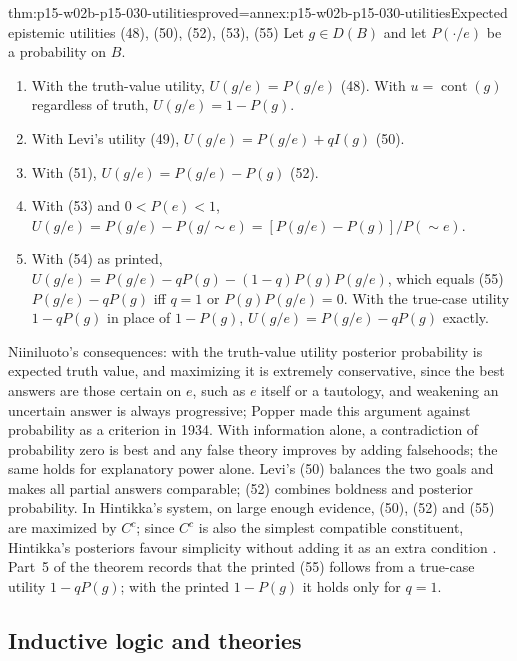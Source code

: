 \begin{hbtheorem}{thm:p15-w02b-p15-030-utilities}{proved=annex:p15-w02b-p15-030-utilities}{Expected epistemic utilities (48), (50), (52), (53), (55)}
Let \(g\in D(B)\) and let \(P(\cdot/e)\) be a probability on \(B\).
\begin{enumerate}
\item With the truth-value utility, \(U(g/e)=P(g/e)\) (48). With
  \(u=\operatorname{cont}(g)\) regardless of truth, \(U(g/e)=1-P(g)\).
\item With Levi's utility (49), \(U(g/e)=P(g/e)+qI(g)\) (50).
\item With (51), \(U(g/e)=P(g/e)-P(g)\) (52).
\item With (53) and \(0<P(e)<1\),
  \(U(g/e)=P(g/e)-P(g/\sim e)=[P(g/e)-P(g)]/P(\sim e)\).
\item With (54) as printed,
  \(U(g/e)=P(g/e)-qP(g)-(1-q)P(g)P(g/e)\), which equals (55)
  \(P(g/e)-qP(g)\) iff \(q=1\) or \(P(g)P(g/e)=0\). With the true-case
  utility \(1-qP(g)\) in place of \(1-P(g)\), \(U(g/e)=P(g/e)-qP(g)\)
  exactly.
\end{enumerate}
\end{hbtheorem}

Niiniluoto's consequences: with the truth-value utility posterior
probability is expected truth value, and maximizing it is extremely
conservative, since the best answers are those certain on \(e\), such as
\(e\) itself or a tautology, and weakening an uncertain answer is always
progressive; Popper made this argument against probability as a criterion
in 1934. With information alone, a contradiction of probability zero is
best and any false theory improves by adding falsehoods; the same holds
for explanatory power alone. Levi's (50) balances the two goals and makes
all partial answers comparable; (52) combines boldness and posterior
probability. In Hintikka's system, on large enough evidence, (50), (52)
and (55) are maximized by \(C^c\); since \(C^c\) is also the simplest
compatible constituent, Hintikka's posteriors favour simplicity without
adding it as an extra condition
\cite[pp.~336--337]{Niiniluoto2011HintikkaProgramReading}. Part~5 of the
theorem records that the printed (55) follows from a true-case utility
\(1-qP(g)\); with the printed \(1-P(g)\) it holds only for \(q=1\).

\subsection{Inductive logic and theories}
\label{sec:p15-w02b-p15-030-nn-theories}

